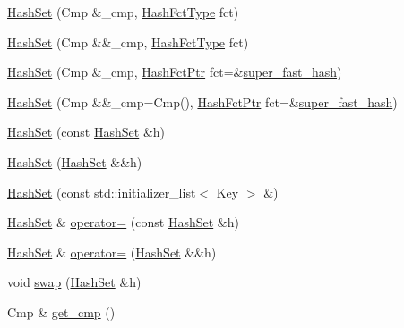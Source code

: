 \begin{DoxyCompactItemize}
\item 
\hyperlink{class_designar_1_1_hash_set_a12dce6e775ae60019e189297040e2cbf}{Hash\+Set} (Cmp \&\+\_\+cmp, \hyperlink{class_designar_1_1_hash_set_a05d8d111665c25bc17290c01fa299398}{Hash\+Fct\+Type} fct)
\item 
\hyperlink{class_designar_1_1_hash_set_aea364027e144f9a079ba56f1c0608c37}{Hash\+Set} (Cmp \&\&\+\_\+cmp, \hyperlink{class_designar_1_1_hash_set_a05d8d111665c25bc17290c01fa299398}{Hash\+Fct\+Type} fct)
\item 
\hyperlink{class_designar_1_1_hash_set_a936fde31abdaab2deac50bfbe4d361a0}{Hash\+Set} (Cmp \&\+\_\+cmp, \hyperlink{class_designar_1_1_hash_set_a7a8b0a4970519ebc9ccc1ad247d0639f}{Hash\+Fct\+Ptr} fct=\&\hyperlink{namespace_designar_afd5712d16b3ae1c1c7d59f1004cd96fd}{super\+\_\+fast\+\_\+hash})
\item 
\hyperlink{class_designar_1_1_hash_set_a200e719b4d0ff01123b3d72bfb510819}{Hash\+Set} (Cmp \&\&\+\_\+cmp=Cmp(), \hyperlink{class_designar_1_1_hash_set_a7a8b0a4970519ebc9ccc1ad247d0639f}{Hash\+Fct\+Ptr} fct=\&\hyperlink{namespace_designar_afd5712d16b3ae1c1c7d59f1004cd96fd}{super\+\_\+fast\+\_\+hash})
\item 
\hyperlink{class_designar_1_1_hash_set_a32f0efeb864585422599f7b3e15f7664}{Hash\+Set} (const \hyperlink{class_designar_1_1_hash_set}{Hash\+Set} \&h)
\item 
\hyperlink{class_designar_1_1_hash_set_a3d0ba0a6da1f06d6637b525ff41fabfa}{Hash\+Set} (\hyperlink{class_designar_1_1_hash_set}{Hash\+Set} \&\&h)
\item 
\hyperlink{class_designar_1_1_hash_set_ad61f40cd2eee2b00ae3285cab3a91087}{Hash\+Set} (const std\+::initializer\+\_\+list$<$ Key $>$ \&)
\item 
\hyperlink{class_designar_1_1_hash_set}{Hash\+Set} \& \hyperlink{class_designar_1_1_hash_set_aed1240e62fdb7745bc9d7a123aa6da6a}{operator=} (const \hyperlink{class_designar_1_1_hash_set}{Hash\+Set} \&h)
\item 
\hyperlink{class_designar_1_1_hash_set}{Hash\+Set} \& \hyperlink{class_designar_1_1_hash_set_af6cb975d4932a49ffde5bdc8dd303f8b}{operator=} (\hyperlink{class_designar_1_1_hash_set}{Hash\+Set} \&\&h)
\item 
void \hyperlink{class_designar_1_1_hash_set_a450af50eb87072d4017822fa952639c6}{swap} (\hyperlink{class_designar_1_1_hash_set}{Hash\+Set} \&h)
\item 
Cmp \& \hyperlink{class_designar_1_1_hash_set_ad799ffaf641176e823513b63be44cfe2}{get\+\_\+cmp} ()
\item 

\end{DoxyCompactItemize}
